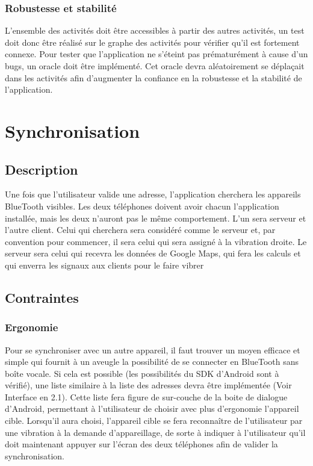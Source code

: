 \documentclass[12pt]{report}
\begin{document}
\subsubsection{Robustesse et stabilité}
L'ensemble des activités doit être accessibles à partir des autres activités, un test doit donc être réalisé sur le graphe des activités pour vérifier qu'il est fortement connexe. Pour tester que l'application ne s'éteint pas prématurément à cause d'un bugs, un oracle doit être implémenté. Cet oracle devra aléatoirement se déplaçait dans les activités afin d'augmenter la confiance en la robustesse et la stabilité de l'application.

\section{Synchronisation} 

\subsection{Description}
Une fois que l'utilisateur valide une adresse, l'application cherchera les appareils BlueTooth visibles. 
Les deux téléphones doivent avoir chacun l'application installée, mais les deux n'auront pas le même comportement. L'un sera serveur et l'autre client. Celui qui cherchera sera considéré comme le serveur et, par convention pour commencer, il sera celui qui sera assigné à la vibration droite. Le serveur sera celui qui recevra les données de Google Maps, qui fera les calculs et qui enverra les signaux aux clients pour le faire vibrer

\subsection{Contraintes}

\subsubsection{Ergonomie} Pour se synchroniser avec un autre appareil, il faut trouver un moyen efficace et simple qui fournit à un aveugle la possibilité de se connecter en BlueTooth sans boîte vocale. Si cela est possible (les possibilités du SDK d'Android sont à vérifié), une liste similaire à la liste des adresses devra être implémentée (Voir Interface en 2.1). Cette liste fera figure de sur-couche de la boite de dialogue d'Android, permettant à l'utilisateur de choisir avec plus d'ergonomie l'appareil cible. Lorsqu'il aura choisi, l'appareil cible se fera reconnaître de l'utilisateur par une vibration à la demande d'appareillage, de sorte à indiquer à l'utilisateur qu'il doit maintenant appuyer sur l'écran des deux téléphones afin de valider la synchronisation.
\end{document}
